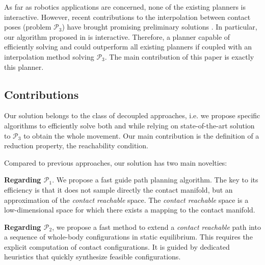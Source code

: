 
As far as robotics applications are concerned, none of the existing planners is \gls{interactive}.
However, recent contributions to the interpolation between contact poses (problem $\mathcal{P}_3$) have brought promising preliminary solutions \citep{Hauser2014, herzog2015trajectory, Park116, Carpentier2016}. In particular, our algorithm proposed in \cite{Carpentier2016} is \gls{interactive}.
Therefore, a planner capable of efficiently solving \Pa and \Pb could outperform all existing planners if coupled with an interpolation method solving $\mathcal{P}_3$.
The main contribution of this paper is exactly this planner.


\subsection{Contributions}

Our solution belongs to the class of decoupled approaches, 
i.e. 
we
propose
specific
algorithms
to
efficiently
solve
both
\Pa
and \Pb
while 
relying 
on 
state-of-the-art 
solution 
to 
$\mathcal{P}_3$
to 
obtain
the
whole
movement.
Our
main
contribution
is
the
definition        
of
a reduction property, the reachability condition.

Compared to previous approaches, our solution has two main novelties: 

\noindent \textbf{Regarding $\mathcal{P}_1$}. We propose a fast guide path planning algorithm. The key to its efficiency is that it does not sample directly the contact manifold, but an approximation of the \textit{contact reachable} space. The \textit{contact reachable} space is a low-dimensional space for which there exists a mapping to the contact manifold.

\noindent \textbf{Regarding $\mathcal{P}_2$},  we propose a fast method to extend a \textit{contact reachable} path into a sequence of whole-body configurations in static equilibrium. This  requires the explicit computation of contact configurations. It is guided by dedicated heuristics that quickly synthesize feasible configurations.

